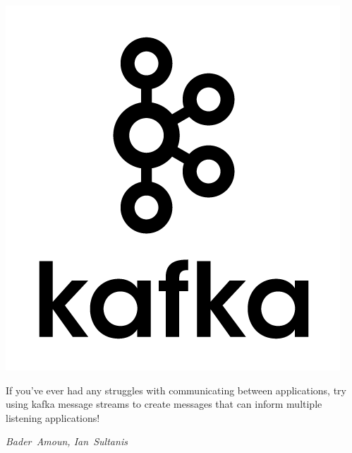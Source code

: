 \hfill\includegraphics[width=.5\linewidth]{images/kafka_logo.png}

If you've ever had any struggles with communicating between applications, try using kafka message streams to create messages that can inform multiple listening applications!

\hfill\textit{Bader~Amoun, Ian~Sultanis}
